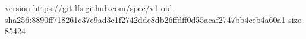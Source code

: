version https://git-lfs.github.com/spec/v1
oid sha256:8890ff718261c37e9ad3e1f2742dde8db26ffdff0d55acaf2747bb4ceb4a60a1
size 85424
